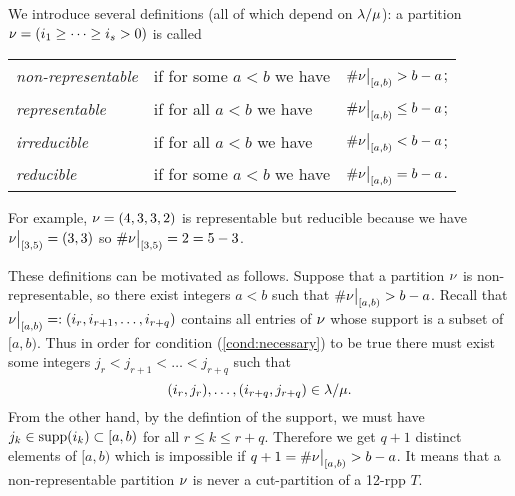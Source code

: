 \documentclass[numbers=enddot,12pt,final,onecolumn,notitlepage]{scrartcl}%
\theoremstyle{definition}
\begin{document}
We introduce several definitions (all of which depend on ${\lambda/\mu}$): a partition ${{\nu}}=(i_1\geq \dots\geq i_s>0)$ is called

\begin{tabular}{@{$\bullet$ }lll}
 \textit{non-representable} & if for some $a<b$ we have & $\#{{{\nu}}\big|_{[a,b)}}>b-a$;\\
 \textit{representable}& if for all $a<b$ we have& $\#{{{\nu}}\big|_{[a,b)}}\leq b-a$;\\
 \textit{irreducible}& if for all  $a<b$ we have &$\#{{{\nu}}\big|_{[a,b)}} < b-a$;\\
 \textit{reducible} &if for some $a<b$ we have &$\#{{{\nu}}\big|_{[a,b)}}=b-a$.
\end{tabular}

For example, ${{\nu}}=(4,3,3,2)$ is representable but reducible because we have ${{{\nu}}\big|_{[3,5)}}=(3,3)$ so $\#{{{\nu}}\big|_{[3,5)}}=2=5-3$.

These definitions can be motivated as follows. Suppose that a partition ${{\nu}}$ is non-representable, so there exist integers $a<b$ such that $\#{{{\nu}}\big|_{[a,b)}}>b-a$. Recall that ${{{\nu}}\big|_{[a,b)}}=:(i_r,i_{r+1},\dots,i_{r+q})$ contains all entries of ${{\nu}}$ whose support is a subset of $[a,b)$. Thus in order for condition (\ref{cond:necessary}) to be true there must exist some integers $j_r<j_{r+1}<\dots<j_{r+q}$ such that 
$$(i_r, j_r),\dots,(i_{r+q},j_{r+q})\in{\lambda/\mu}.$$
From the other hand, by the defintion of the support, we must have $j_k\in {\operatorname*{supp}}(i_k)\subset [a,b)$ for all $r\leq k\leq r+q$. Therefore we get $q+1$ distinct elements of $[a,b)$ which is impossible if $q+1=\#{{{\nu}}\big|_{[a,b)}}>b-a$. It means that a non-representable partition ${{\nu}}$ is never a cut-partition of a 12-rpp $T$. 
\end{document}
